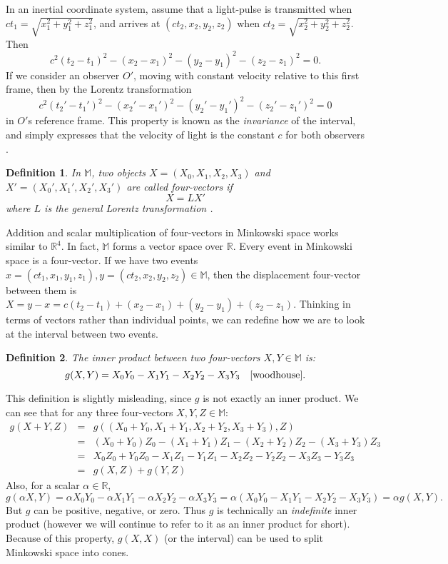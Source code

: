 \documentclass[12pt]{article}
\theoremstyle{defn}
\newtheorem{defn}{Definition}
\theoremstyle{pf}
\newcommand{\M}{\mathbb{M}}
\newcommand{\R}{\mathbb{R}}
\newcommand{\0}{\emptyset}
\renewcommand{\-}{\setminus}
\begin{document}
In an inertial coordinate system, assume that a light-pulse is transmitted when $ct_1=\sqrt{x_1^2+y_1^2+z_1^2}$, and arrives at $(ct_2,x_2,y_2,z_2)$ when $ct_2=\sqrt{x_2^2+y_2^2+z_2^2}$. Then $$c^2(t_2-t_1)^2-(x_2-x_1)^2-(y_2-y_1)^2-(z_2-z_1)^2=0.$$ If we consider an observer $O'$, moving with constant velocity relative to this first frame, then by the Lorentz transformation $$c^2(t_2'-t_1')^2-(x_2'-x_1')^2-(y_2'-y_1')^2-(z_2'-z_1')^2=0$$ in $O'$s reference frame. This property is known as the \textit{invariance} of the interval, and simply expresses that the velocity of light is the constant $c$ for both observers \cite{shadowitz}.

\begin{defn}In $\M$, two objects $X=(X_0,X_1,X_2,X_3)$ and $X'=(X_0',X_1',X_2',X_3')$ are called \textit{four-vectors} if $$X=LX'$$ where $L$ is the general Lorentz transformation \cite{woodhouse}.
\end{defn}

Addition and scalar multiplication of four-vectors in Minkowski space works similar to $\R^4$. In fact, $\M$ forms a vector space over $\R$. Every event in Minkowski space is a four-vector. If we have two events $x=(ct_1,x_1,y_1,z_1), y=(ct_2,x_2,y_2,z_2)\in\M$, then the displacement four-vector between them is $X=y-x=c(t_2-t_1)+(x_2-x_1)+(y_2-y_1)+(z_2-z_1).$ Thinking in terms of vectors rather than individual points, we can redefine how we are to look at the interval between two events.

\begin{defn}The \textit{inner product} between two four-vectors $X,Y\in \M$ is:
 $$g(X,Y)=X_0Y_0-X_1Y_1-X_2Y_2-X_3Y_3 \quad \mbox{\cite{woodhouse}}.$$
\end{defn}

This definition is slightly misleading, since $g$ is not exactly an inner product. We can see that for any three four-vectors $X,Y,Z\in \M$:
\begin{eqnarray*} g(X+Y,Z)&=&g\left((X_0+Y_0,X_1+Y_1,X_2+Y_2,X_3+Y_3),Z\right)\\
&=&(X_0+Y_0)Z_0-(X_1+Y_1)Z_1-(X_2+Y_2)Z_2-(X_3+Y_3)Z_3\\
&=&X_0Z_0+Y_0Z_0-X_1Z_1-Y_1Z_1-X_2Z_2-Y_2Z_2-X_3Z_3-Y_3Z_3\\
&=&g(X,Z)+g(Y,Z)\end{eqnarray*} Also, for a scalar $\alpha\in \R$, $$g(\alpha X,Y)=\alpha X_0Y_0-\alpha X_1Y_1-\alpha X_2Y_2-\alpha X_3Y_3=\alpha(X_0Y_0-X_1Y_1-X_2Y_2-X_3Y_3)=\alpha g(X,Y).$$ But $g$ can be positive, negative, or zero. Thus $g$ is technically an \textit{indefinite} inner product (however we will continue to refer to it as an inner product for short). Because of this property, $g(X,X)$ (or the interval) can be used to split Minkowski space into cones.
\end{document}

